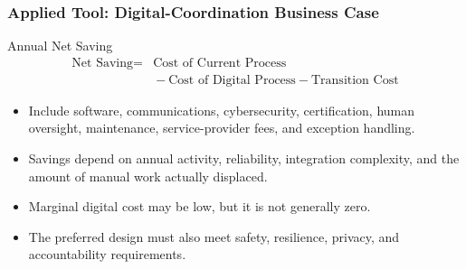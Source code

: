 \documentclass{beamer}
\begin{document}
\begin{frame}[t]
\frametitle{Applied Tool: Digital-Coordination Business Case}
\begin{block}{Annual Net Saving}
\[
\begin{aligned}
\text{Net Saving} = {} & \text{Cost of Current Process} \\
& {} - \text{Cost of Digital Process} - \text{Transition Cost}
\end{aligned}
\]
\end{block}
\begin{itemize}
\item Include software, communications, cybersecurity, certification, human oversight, maintenance, service-provider fees, and exception handling.
\item Savings depend on annual activity, reliability, integration complexity, and the amount of manual work actually displaced.
\item Marginal digital cost may be low, but it is not generally zero.
\item The preferred design must also meet safety, resilience, privacy, and accountability requirements.
\end{itemize}
\end{frame}
\end{document}
